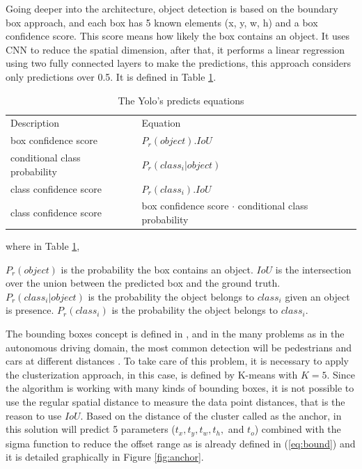 Going deeper into the architecture, object detection is based on the boundary box approach, and each box has 5 known elements (x, y, w, h) and a box confidence score. This score means how likely the box contains an object. It uses CNN to reduce the spatial dimension, after that, it performs a linear regression using two fully connected layers to make the predictions, this approach considers only predictions over 0.5. It is defined in Table \ref{eq:prob_yolo}. 


\begin{table}[H]
\centering
\caption{The Yolo's predicts equations}
\begin{tabular}{l|l} 
\toprule
Description~                   & Equation                                                                 \\
box confidence score           & $P_r(object).IoU$                                                     \\
conditional class probability~ & $P_r(class_i|object)$                                       \\
class confidence score         & $P_r(class_i).IoU$                                                   \\
class confidence score         & box confidence score $\cdot$ conditional class probability  \\
\bottomrule
\end{tabular}
\label{eq:prob_yolo}
\end{table}

where in Table \ref{eq:prob_yolo}, 

$P_r(object)$ is the probability the box contains an object.
$IoU$ is the intersection over the union between the predicted box and the ground truth.
$P_r(class_i|object)$ is the probability the object belongs to $class_i$ given an object is presence.
$P_r(class_i)$ is the probability the object belongs to $class_i$.

The bounding boxes concept is defined in \cite{redmon2017yolo9000}, and in the many problems as in the autonomous driving domain, the most common detection will be pedestrians and cars at different distances \cite{ess2010object}. To take care of this problem, it is necessary to apply the clusterization approach, in this case, is defined by K-means with $K=5$. Since the algorithm is working with many kinds of bounding boxes, it is not possible to use the regular spatial distance to measure the data point distances, that is the reason to use $IoU$. Based on the distance of the cluster called as the anchor, in this solution will predict 5 parameters ($t_x, t_y, t_w, t_h,$ and $t_o$) combined with the sigma function to reduce the offset range as is already defined in (\ref{eq:bound}) and it is detailed graphically in Figure \ref{fig:anchor}.


